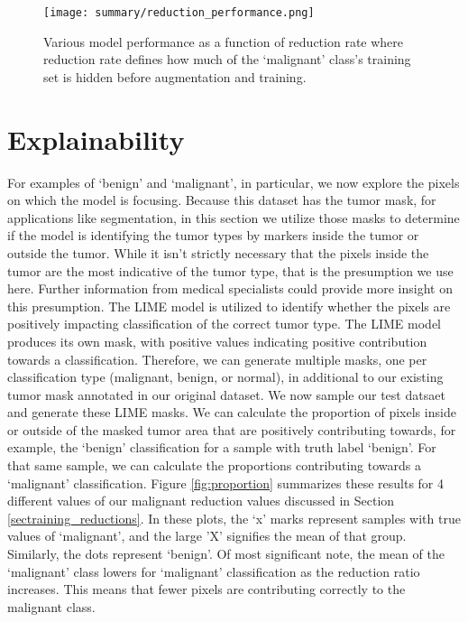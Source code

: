 \documentclass[sn-mathphys,Numbered]{sn-jnl}%
\theoremstyle{thmstyleone}%
\theoremstyle{thmstyletwo}%
\theoremstyle{thmstylethree}%
\begin{document}
\begin{figure}[!htbp]
    \centering

    \texttt{[image: summary/reduction\_performance.png]}

    \caption{Various model performance as a function of reduction rate where reduction rate defines how much of the `malignant' class's training set is hidden before augmentation and training.}
    \label{fig:reduction_performance}
\end{figure}


\section{Explainability}\label{sec_explain}
For examples of `benign' and `malignant', in particular, we now explore the pixels on which the model is focusing.  Because this dataset has the tumor mask, for applications like segmentation, in this section we utilize those masks to determine if the model is identifying the tumor types by markers inside the tumor or outside the tumor.  While it isn't strictly necessary that the pixels inside the tumor are the most indicative of the tumor type, that is the presumption we use here.  Further information from medical specialists could provide more insight on this presumption.  
The LIME model is utilized to identify whether the pixels are positively impacting classification of the correct tumor type.  The LIME model produces its own mask, with positive values indicating positive contribution towards a classification.  Therefore, we can generate multiple masks, one per classification type (malignant, benign, or normal), in additional to our existing tumor mask annotated in our original dataset.  
We now sample our test datsaet and generate these LIME masks.  We can calculate the proportion of pixels inside or outside of the masked tumor area that are positively contributing towards, for example, the `benign' classification for a sample with truth label 	`benign'.  For that same sample, we can calculate the proportions contributing towards a `malignant' classification.  Figure \ref{fig:proportion} summarizes these results for 4 different values of our malignant reduction values discussed in Section \ref{sectraining_reductions}.  In these plots, the `x' marks represent samples with true values of `malignant', and the large 'X' signifies the mean of that group.  Similarly, the dots represent `benign'.  
Of most significant note, the mean of the `malignant' class lowers for `malignant' classification as the reduction ratio increases.  This means that fewer pixels are contributing correctly to the malignant class. 
\end{document}
